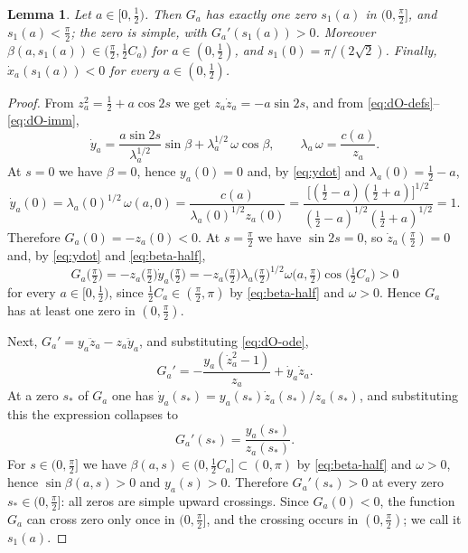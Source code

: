 \documentclass[11pt,a4paper]{amsart}
\theoremstyle{plain}
\newtheorem{lemma}[theorem]{Lemma}
\theoremstyle{definition}
\begin{document}
\begin{lemma}\label{lem:s1}
Let $a\in[0,\tfrac12)$. Then $G_a$ has exactly one zero $s_1(a)$ in $(0,\tfrac\pi2]$, and $s_1(a)<\tfrac\pi2$; the zero is simple, with $G_a'(s_1(a))>0$. Moreover $\beta(a,s_1(a))\in\bigl(\tfrac\pi2,\tfrac12C_a\bigr)$ for $a\in(0,\tfrac12)$, and $s_1(0)=\pi/(2\sqrt2)$. Finally, $\dot x_a(s_1(a))<0$ for every $a\in(0,\tfrac12)$.
\end{lemma}

\begin{proof}
From $z_a^2=\tfrac12+a\cos2s$ we get $z_a\dot z_a=-a\sin 2s$, and from \eqref{eq:dO-defs}--\eqref{eq:dO-imm},
\begin{equation}\label{eq:ydot}
\dot y_a=\frac{a\sin 2s}{\lambda_a^{1/2}}\sin\beta+\lambda_a^{1/2}\,\omega\cos\beta,\qquad \lambda_a\,\omega=\frac{c(a)}{z_a}.
\end{equation}
At $s=0$ we have $\beta=0$, hence $y_a(0)=0$ and, by \eqref{eq:ydot} and $\lambda_a(0)=\tfrac12-a$,
\[
\dot y_a(0)=\lambda_a(0)^{1/2}\,\omega(a,0)=\frac{c(a)}{\lambda_a(0)^{1/2}z_a(0)}=\frac{\bigl[(\tfrac12-a)(\tfrac12+a)\bigr]^{1/2}}{(\tfrac12-a)^{1/2}(\tfrac12+a)^{1/2}}=1 .
\]
Therefore $G_a(0)=-z_a(0)<0$. At $s=\tfrac\pi2$ we have $\sin 2s=0$, so $\dot z_a(\tfrac\pi2)=0$ and, by \eqref{eq:ydot} and \eqref{eq:beta-half},
\[
G_a\bigl(\tfrac\pi2\bigr)=-z_a\bigl(\tfrac\pi2\bigr)\dot y_a\bigl(\tfrac\pi2\bigr)=-z_a\bigl(\tfrac\pi2\bigr)\lambda_a\bigl(\tfrac\pi2\bigr)^{1/2}\omega\bigl(a,\tfrac\pi2\bigr)\cos\bigl(\tfrac12C_a\bigr)>0
\]
for every $a\in[0,\tfrac12)$, since $\tfrac12C_a\in(\tfrac\pi2,\pi)$ by \eqref{eq:beta-half} and $\omega>0$. Hence $G_a$ has at least one zero in $(0,\tfrac\pi2)$.

Next, $G_a'=y_a\ddot z_a-z_a\ddot y_a$, and substituting \eqref{eq:dO-ode},
\[
G_a'=-\frac{y_a(\dot z_a^2-1)}{z_a}+\dot y_a\dot z_a .
\]
At a zero $s_*$ of $G_a$ one has $\dot y_a(s_*)=y_a(s_*)\dot z_a(s_*)/z_a(s_*)$, and substituting this the expression collapses to
\begin{equation}\label{eq:Gprime}
G_a'(s_*)=\frac{y_a(s_*)}{z_a(s_*)} .
\end{equation}
For $s\in(0,\tfrac\pi2]$ we have $\beta(a,s)\in(0,\tfrac12C_a]\subset(0,\pi)$ by \eqref{eq:beta-half} and $\omega>0$, hence $\sin\beta(a,s)>0$ and $y_a(s)>0$. Therefore $G_a'(s_*)>0$ at every zero $s_*\in(0,\tfrac\pi2]$: all zeros are simple upward crossings. Since $G_a(0)<0$, the function $G_a$ can cross zero only once in $(0,\tfrac\pi2]$, and the crossing occurs in $(0,\tfrac\pi2)$; we call it $s_1(a)$.


\end{proof}
\end{document}

